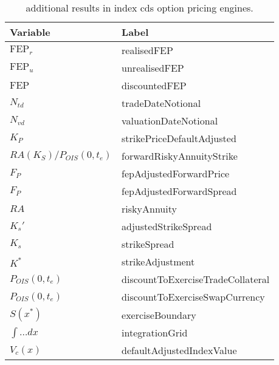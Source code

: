 \begin{table}[hbt]
  \begin{tabular}{|l|l|}
    \hline
    Variable & Label \\
    \hline
    $\text{FEP}_r$            & realisedFEP \\
    $\text{FEP}_u$            & unrealisedFEP \\
    $\text{FEP}$              & discountedFEP \\
    $N_{td}$                   & tradeDateNotional \\
    $N_{vd}$                   & valuationDateNotional \\
    $K_P$                     & strikePriceDefaultAdjusted \\
    $RA(K_S)/P_{OIS}(0,t_e)$   & forwardRiskyAnnuityStrike \\
    $F_P$                     & fepAdjustedForwardPrice \\
    $F_P$                     & fepAdjustedForwardSpread \\
    $RA$                      & riskyAnnuity \\
    $K_s'$                    & adjustedStrikeSpread \\
    $K_s$                     & strikeSpread \\
    $K^*$                     & strikeAdjustment \\
    $P_{OIS}(0,t_e)$           & discountToExerciseTradeCollateral \\
    $P_{OIS}(0,t_e)$           & discountToExerciseSwapCurrency \\
    $S(x^*)$                  & exerciseBoundary \\
    $\int \ldots dx$          & integrationGrid \\
    $V_c(x)$                  & defaultAdjustedIndexValue \\
    \hline
  \end{tabular}
  \caption{additional results in index cds option pricing engines.}
  \label{tab:cr_indexcdsoption_addresults}
\end{table}

